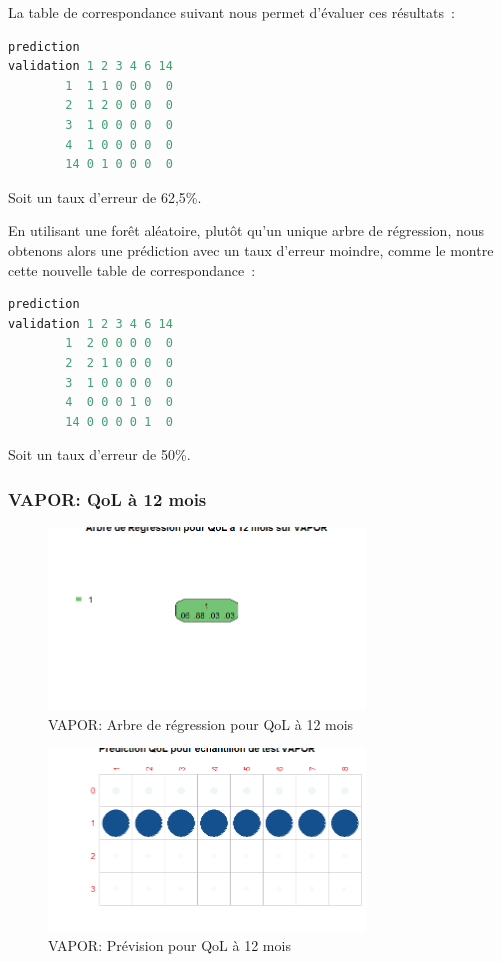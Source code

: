 La table de correspondance suivant nous permet d'évaluer ces résultats~:
\begin{lstlisting}[language=R]
          prediction
validation 1 2 3 4 6 14
        1  1 1 0 0 0  0
        2  1 2 0 0 0  0
        3  1 0 0 0 0  0
        4  1 0 0 0 0  0
        14 0 1 0 0 0  0
\end{lstlisting}
Soit un taux d'erreur de 62,5\%.

En utilisant une forêt aléatoire, plutôt qu'un unique arbre de régression, nous obtenons alors une
prédiction avec un taux d'erreur moindre, comme le montre cette nouvelle table de correspondance~:
\begin{lstlisting}[language=R]
          prediction
validation 1 2 3 4 6 14
        1  2 0 0 0 0  0
        2  2 1 0 0 0  0
        3  1 0 0 0 0  0
        4  0 0 0 1 0  0
        14 0 0 0 0 1  0
\end{lstlisting}
Soit un taux d'erreur de 50\%.
        
\subsubsection{VAPOR: QoL à 12 mois}

\begin{figure}[H]
\centering
\includegraphics[width=0.75\textwidth]{../Fig/VAPOR/vapor-regtree-qol12.png}
\caption{VAPOR: Arbre de régression pour QoL à 12 mois}
\label{fig-vapor-regtree-qol12}
\end{figure}

\begin{figure}[H]
\centering
\includegraphics[width=0.75\textwidth]{../Fig/VAPOR/vapor-regtree-predict-qol12.png}
\caption{VAPOR: Prévision pour QoL à 12 mois}
\label{fig-vapor-regtree-predict-qol12}
\end{figure}

